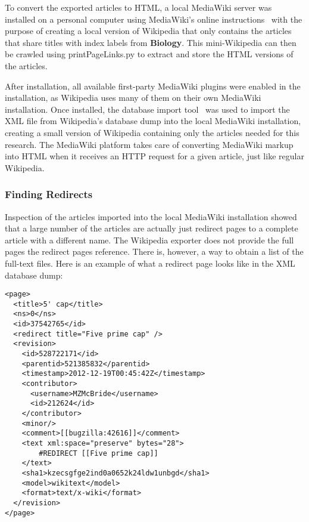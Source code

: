 To convert the exported articles to HTML, a local MediaWiki server was installed on a personal computer using MediaWiki's online instructions~\cite{mediawiki-installation} with the purpose of creating a local version of Wikipedia that only contains the articles that share titles with index labels from {\bf Biology}.
This mini-Wikipedia can then be crawled using printPageLinks.py to extract and store the HTML versions of the articles.

After installation, all available first-party MediaWiki plugins were enabled in the installation, as Wikipedia uses many of them on their own MediaWiki installation.
Once installed, the database import tool~\cite{mediawiki-import} was used to import the XML file from Wikipedia's database dump into the local MediaWiki installation, creating a small version of Wikipedia containing only the articles needed for this research.
The MediaWiki platform takes care of converting MediaWiki markup into HTML when it receives an HTTP request for a given article, just like regular Wikipedia.

\subsubsection{Finding Redirects}
\label{subsec:finding-redirects}

Inspection of the articles imported into the local MediaWiki installation showed that a large number of the articles are actually just redirect pages to a complete article with a different name.
The Wikipedia exporter does not provide the full pages the redirect pages reference.
There is, however, a way to obtain a list of the full-text files.
Here is an example of what a redirect page looks like in the XML database dump:

\begin{lstlisting}
<page>
  <title>5' cap</title>
  <ns>0</ns>
  <id>37542765</id>
  <redirect title="Five prime cap" />
  <revision>
    <id>528722171</id>
    <parentid>521385832</parentid>
    <timestamp>2012-12-19T00:45:42Z</timestamp>
    <contributor>
      <username>MZMcBride</username>
      <id>212624</id>
    </contributor>
    <minor/>
    <comment>[[bugzilla:42616]]</comment>
    <text xml:space="preserve" bytes="28">
        #REDIRECT [[Five prime cap]]
    </text>
    <sha1>kzecsgfge2ind0a0652k24ldw1unbgd</sha1>
    <model>wikitext</model>
    <format>text/x-wiki</format>
  </revision>
</page>
\end{lstlisting}

